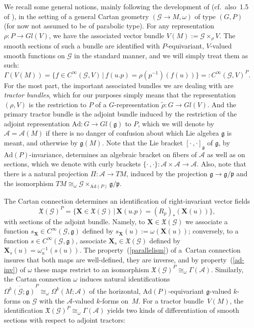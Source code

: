 \documentclass[pdftex]{sigma}
\def\g{\mathfrak{g}}
\def\p{\mathfrak{p}}
\def\Abdle{\mathcal{A}}
\def\Gbdle{\mathcal{G}}
\def\VF{\mathfrak{X}}
\def\isom{\cong}
\theoremstyle{plain}
\theoremstyle{definition}
\begin{document}
We recall some general notions, mainly following the development of \cite{Cap inf aut} (cf.\ also~1.5 of \cite{CSbook}), in the setting of a general Cartan geometry $(\Gbdle \rightarrow M,\omega)$ of type $(G,P)$ (for now not assumed to be of parabolic type). For any representation $\rho: P \rightarrow Gl(V)$, we have the associated vector bundle $V(M) := \Gbdle \times_{\rho} V$. The smooth sections of such a bundle are identif\/ied with $P$-equivariant, $V$-valued smooth functions on $\Gbdle$ in the standard manner, and we will simply treat them as such:
\[
\Gamma(V(M)) = \big\{f \in C^{\infty}(\Gbdle,V) \, \vert \, f(u.p) = \rho(p^{-1})(f(u))\big\} =: C^{\infty}(\Gbdle,V)^P.
\]
For the most part, the important associated bundles we are dealing with are \emph{tractor bundles}, which for our purposes simply means that the representation $(\rho,V)$ is the restriction to $P$ of a $G$-representation $\tilde{\rho}:G \rightarrow Gl(V)$. And the primary tractor bundle is the adjoint bundle induced by the restriction of the adjoint representation $\mathrm{Ad}: G \rightarrow Gl(\g)$ to $P$, which we will denote by $\Abdle = \Abdle(M)$ if there is no danger of confusion about which Lie algebra $\g$ is meant, and otherwise by $\g(M)$. Note that the Lie bracket $[\cdot \, ,\cdot]_{\g}$ of $\g$, by $\mathrm{Ad}(P)$-invariance, determines an algebraic bracket on f\/ibers of $\Abdle$ as well as on sections, which we denote with curly brackets $\{\cdot \, ,\cdot\}: \Abdle \times \Abdle \rightarrow \Abdle$. Also, note that there is a natural projection $\Pi: \Abdle \rightarrow TM$, induced by the projection $\g \rightarrow \g/\p$ and the isomorphism $TM \isom_{\omega} \Gbdle \times_{\overline{\mathrm{Ad}}(P)} \g/\p$.

The Cartan connection determines an identif\/ication of right-invariant vector f\/ields
\[
\VF(\Gbdle)^P = \{ \mathbf{X} \in \VF(\Gbdle) \, \vert \, \mathbf{X}(u.p) = (R_p)_* (\mathbf{X}(u))\},
\]
with sections of the adjoint bundle. Namely, to $\mathbf{X} \in \VF(\Gbdle)$ we associate a function $s_{\mathbf{X}} \in C^{\infty}(\Gbdle,\g)$ def\/ined by $s_{\mathbf{X}}(u) := \omega(\mathbf{X}(u))$; conversely, to a function $s \in C^{\infty}(\Gbdle,\g)$, associate $\mathbf{X}_s \in \VF(\Gbdle)$ def\/ined by $\mathbf{X}_s(u) = \omega_u^{-1}(s(u))$. The property~(\ref{parallelism}) of a~Cartan connection insures that both maps are well-def\/ined, they are inverse, and by property~(\ref{ad-inv}) of $\omega$ these maps restrict to an isomorphism $\VF(\Gbdle)^P \isom_{\omega} \Gamma(\Abdle)$. Similarly, the Cartan connection $\omega$ induces natural identif\/ications $\overline{\Omega^k(\Gbdle;\g)}^P \isom_{\omega} \Omega^k(M;\Abdle)$ of the horizontal, $\mathrm{Ad}(P)$-equivariant $\g$-valued $k$-forms on $\Gbdle$ with the $\Abdle$-valued $k$-forms on~$M$. For a tractor bundle~$V(M)$, the identif\/ication $\VF(\Gbdle)^P \isom_{\omega} \Gamma(\Abdle)$ yields two kinds of dif\/ferentiation of smooth sections with respect to adjoint tractors:
\end{document}
